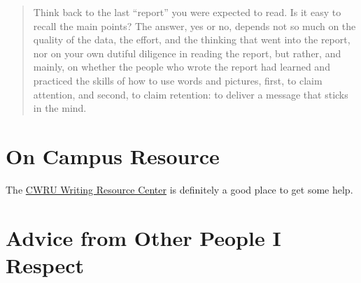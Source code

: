 \documentclass[
]{book}
\begin{document}
\begin{quote}
Think back to the last ``report'' you were expected to read. Is it easy to recall the main points? The answer, yes or no, depends not so much on the quality of the data, the effort, and the thinking that went into the report, nor on your own dutiful diligence in reading the report, but rather, and mainly, on whether the people who wrote the report had learned and practiced the skills of how to use words and pictures, first, to claim attention, and second, to claim retention: to deliver a message that sticks in the mind.
\end{quote}

\hypertarget{on-campus-resource}{%
\section{On Campus Resource}\label{on-campus-resource}}

The \href{https://writingcenter.case.edu/}{CWRU Writing Resource Center} is definitely a good place to get some help.

\hypertarget{advice-from-other-people-i-respect}{%
\section{Advice from Other People I Respect}\label{advice-from-other-people-i-respect}}
\end{document}
